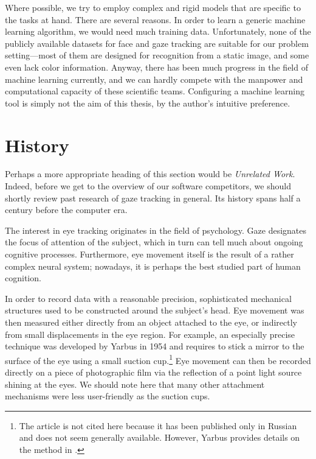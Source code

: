 Where possible, we try to employ complex and rigid models that are specific to the tasks at hand.
There are several reasons.
In order to learn a generic machine learning algorithm, we would need much training data.
Unfortunately, none of the publicly available datasets for face and gaze tracking are suitable for our problem setting---most of them are designed for recognition from a static image, and some even lack color information.
Anyway, there has been much progress in the field of machine learning currently, and we can hardly compete with the manpower and computational capacity of these scientific teams.
Configuring a machine learning tool is simply not the aim of this thesis, by the author's intuitive preference.

\section{History}

Perhaps a more appropriate heading of this section would be \textit{Unrelated Work}.
Indeed, before we get to the overview of our software competitors, we should shortly review past research of gaze tracking in general.
Its history spans half a century before the computer era.

The interest in eye tracking originates in the field of psychology.
Gaze designates the focus of attention of the subject, which in turn can tell much about ongoing cognitive processes.
Furthermore, eye movement itself is the result of a rather complex neural system; nowadays, it is perhaps the best studied part of human cognition.

In order to record data with a reasonable precision, sophisticated mechanical structures used to be constructed around the subject's head.
Eye movement was then measured either directly from an object attached to the eye, or indirectly from small displacements in the eye region.
For example, an especially precise technique was developed by Yarbus in 1954 and requires to stick a mirror to the surface of the eye using a small suction cup.\footnote{
The article is not cited here because it has been published only in Russian and does not seem generally available.
However, Yarbus provides details on the method in \cite{b:yarbus67}.
}
Eye movement can then be recorded directly on a piece of photographic film via the reflection of a point light source shining at the eyes.
We should note here that many other attachment mechanisms were less user-friendly as the suction cups.


